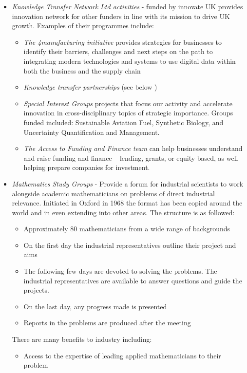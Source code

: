 \documentclass[11pt]{article} %
\begin{document}
\begin{itemize}
		\item \textit{Knowledge Transfer Network Ltd activities }- funded by innovate UK provides innovation network for other funders in line with its mission to drive UK growth. Examples of their programmes include: 
		\begin{itemize}
			\item \textit{ The 4manufacturing initiative } provides strategies for businesses to identify their barriers, challenges and next steps on the path to integrating modern technologies and systems to use digital data within both the business and the supply chain
			\item \textit{Knowledge transfer partnerships} (see below )
			\item \textit{Special Interest Groups} projects that focus our activity and accelerate innovation in cross-disciplinary topics of strategic importance. Groups funded included: Sustainable Aviation Fuel, Synthetic Biology, and Uncertainty Quantification and Management.
			\item \textit{The Access to Funding and Finance team} can help businesses understand and raise funding and finance – lending, grants, or equity based, as well helping prepare companies for investment.
		\end{itemize}
		\item \textit{Mathematics Study Groups} - Provide a forum for industrial scientists to work alongside academic mathematicians  on problems of direct industrial relevance. Initiated in Oxford in 1968 the format has been copied around the world and in even extending into other areas. The structure is as followed: 
		\begin{itemize}
			\item Approximately 80 mathematicians from a wide range of backgrounds
			\item On the first day the industrial representatives outline their project and aims
			\item The following few days are devoted to solving the problems. The industrial representatives are available to answer questions and guide the projects.
			\item On the last day, any progress made is presented
			\item Reports in the problems are produced after the meeting  
		\end{itemize}
		There are many benefits to industry including: 
		\begin{itemize}
			\item Access to the expertise of leading applied mathematicians to their problem

\end{itemize}
\end{itemize}
\end{document}
